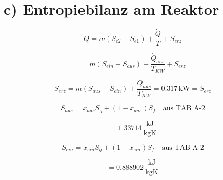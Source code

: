 \section*{c) Entropiebilanz am Reaktor}

\[
Q = \dot{m} (S_{e2} - S_{e1}) + \frac{\dot{Q}}{T} + S_{erz}
\]

\[
= \dot{m} (S_{ein} - S_{aus}) + \frac{\dot{Q}_{aus}}{T_{KW}} + S_{erz}
\]

\[
S_{erz} = \dot{m} (S_{aus} - S_{ein}) + \frac{Q_{aus}}{T_{KW}} = \underline{0.317 \, \text{kW}} = S_{erz}
\]

\[
S_{aus} = x_{aus} S_g + (1 - x_{aus}) S_f \quad \text{aus TAB A-2}
\]

\[
= 1.33714 \, \frac{\text{kJ}}{\text{kgK}}
\]

\[
S_{ein} = x_{ein} S_g + (1 - x_{ein}) S_f \quad \text{aus TAB A-2}
\]

\[
= 0.888902 \, \frac{\text{kJ}}{\text{kgK}}
\]